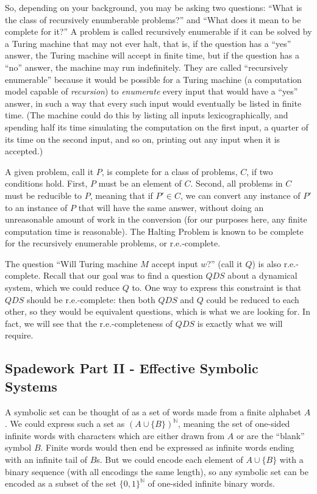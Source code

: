 \documentclass{fkpaper}
\renewcommand{\Nn}{\mathbb{N}}
\begin{document}
\begin{multicols}{2}
So, depending on your background, you may be asking two questions:
``What is the class of recursively enumberable problems?'' and ``What
does it mean to be complete for it?'' A problem is called recursively
enumerable if it can be solved by a Turing machine that may not ever
halt, that is, if the question has a ``yes'' answer, the Turing
machine will accept in finite time, but if the question has a ``no''
answer, the machine may run indefinitely. They are called
``recursively enumerable'' because it would be possible for a Turing
machine (a computation model capable of {\it recursion}) to {\it
  enumerate} every input that would have a ``yes'' answer, in such a
way that every such input would eventually be listed in finite time.
(The machine could do this by listing all inputs lexicographically,
and spending half its time simulating the computation on the first
input, a quarter of its time on the second input, and so on, printing
out any input when it is accepted.)

A given problem, call it $P$, is complete for a class of problems,
$C$, if two conditions hold. First, $P$ must be an element of $C$.
Second, all problems in $C$ must be reducible to $P$, meaning that if
$P' \in C$, we can convert any instance of $P'$ to an instance of $P$
that will have the same answer, without doing an unreasonable amount
of work in the conversion (for our purposes here, any finite
computation time is reasonable). The Halting Problem is known to be
complete for the recursively enumerable problems, or r.e.-complete.

The question ``Will Turing machine $M$ accept input $w$?'' (call it
$Q$) is also r.e.-complete. Recall that our goal was to find a
question $QDS$ about a dynamical system, which we could reduce $Q$ to.
One way to express this constraint is that $QDS$ should be
r.e.-complete: then both $QDS$ and $Q$ could be reduced to each other,
so they would be equivalent questions, which is what we are looking
for. In fact, we will see that the r.e.-completeness of $QDS$ is
exactly what we will require.

\subsection{Spadework Part II - Effective Symbolic Systems}

A symbolic set can be thought of as a set of words made from a finite alphabet $A$. We could express such a set as $(A \cup \{B\})^\Nn$, meaning the set of one-sided infinite words with characters which are either drawn from $A$ or are the ``blank'' symbol $B$. Finite words would then end be expressed as infinite words ending with an infinite tail of $B$s. But we could encode each element of $A \cup \{B\}$ with a binary sequence (with all encodings the same length), so any symbolic set can be encoded as a subset of the set $\{0,1\}^\Nn$ of one-sided infinite binary words.


\end{multicols}
\end{document}
